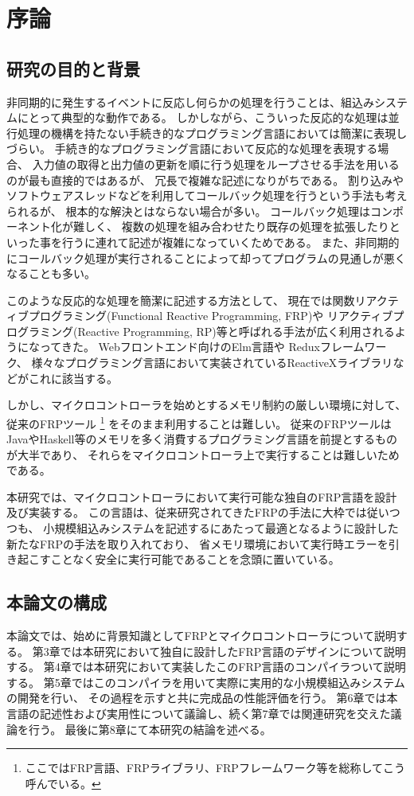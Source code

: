 \chapter{序論}
\section{研究の目的と背景}
非同期的に発生するイベントに反応し何らかの処理を行うことは、組込みシステムにとって典型的な動作である。
しかしながら、こういった反応的な処理は並行処理の機構を持たない手続き的なプログラミング言語においては簡潔に表現しづらい。
手続き的なプログラミング言語において反応的な処理を表現する場合、
入力値の取得と出力値の更新を順に行う処理をループさせる手法を用いるのが最も直接的ではあるが、
冗長で複雑な記述になりがちである。
割り込みやソフトウェアスレッドなどを利用してコールバック処理を行うという手法も考えられるが、
根本的な解決とはならない場合が多い。
コールバック処理はコンポーネント化が難しく、
複数の処理を組み合わせたり既存の処理を拡張したりといった事を行うに連れて記述が複雑になっていくためである。
また、非同期的にコールバック処理が実行されることによって却ってプログラムの見通しが悪くなることも多い。

このような反応的な処理を簡潔に記述する方法として、
現在では関数リアクティブプログラミング(Functional Reactive Programming, FRP)や
リアクティブプログラミング(Reactive Programming, RP)等と呼ばれる手法が広く利用されるようになってきた。
Webフロントエンド向けのElm言語\cite{czaplicki2012elm,czaplicki2013asynchronous}や
Reduxフレームワーク\cite{reduxwebsite}、
様々なプログラミング言語において実装されているReactiveXライブラリ\cite{rxwebsite}などがこれに該当する。

しかし、マイクロコントローラを始めとするメモリ制約の厳しい環境に対して、従来のFRPツール
\footnote{ここではFRP言語、FRPライブラリ、FRPフレームワーク等を総称してこう呼んでいる。}
をそのまま利用することは難しい。
従来のFRPツールはJavaやHaskell等のメモリを多く消費するプログラミング言語を前提とするものが大半であり、
それらをマイクロコントローラ上で実行することは難しいためである。

本研究では、マイクロコントローラにおいて実行可能な独自のFRP言語を設計及び実装する。
この言語は、従来研究されてきたFRPの手法に大枠では従いつつも、
小規模組込みシステムを記述するにあたって最適となるように設計した新たなFRPの手法を取り入れており、
省メモリ環境において実行時エラーを引き起こすことなく安全に実行可能であることを念頭に置いている。

\section{本論文の構成}
本論文では、始めに背景知識としてFRPとマイクロコントローラについて説明する。
第3章では本研究において独自に設計したFRP言語のデザインについて説明する。
第4章では本研究において実装したこのFRP言語のコンパイラついて説明する。
第5章ではこのコンパイラを用いて実際に実用的な小規模組込みシステムの開発を行い、
その過程を示すと共に完成品の性能評価を行う。
第6章では本言語の記述性および実用性について議論し、続く第7章では関連研究を交えた議論を行う。
最後に第8章にて本研究の結論を述べる。
